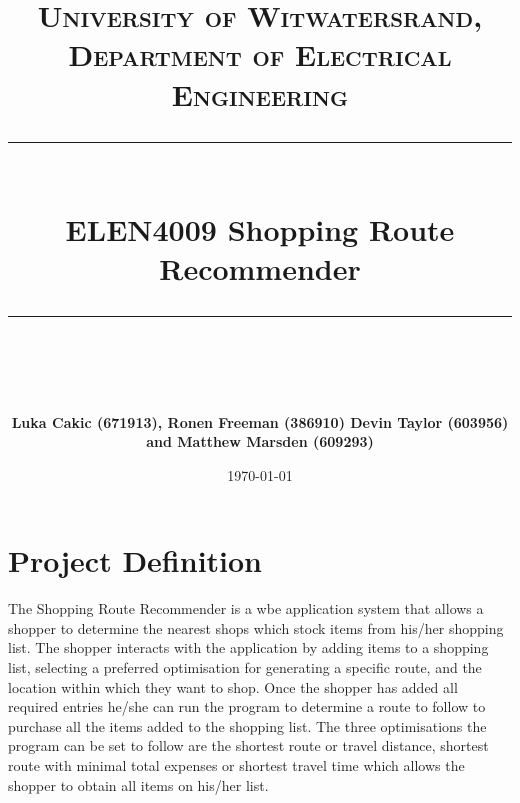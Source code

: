 \documentclass[10pt, a4paper, onecolumn]{scrartcl}
\newcommand{\horrule}[1]{\rule{\linewidth}{#1}}
\begin{document}
		\title{\normalfont \normalsize
			\textsc{University of Witwatersrand, Department of Electrical Engineering} \\ [10pt]
			\horrule{0.5pt} \\ [10pt]
			\huge ELEN4009 Shopping Route Recommender \\
			\horrule{2pt} \\ [10pt]}
		\author{\textbf{\normalsize{Luka Cakic (671913), Ronen Freeman (386910) Devin Taylor (603956) and Matthew Marsden (609293)}} \\ [10pt]}
		\date {\normalsize \today}
		
		\maketitle
		
%		
%		
%
%			
%	
		
	\section{Project Definition}
		
		The Shopping Route Recommender is a wbe application system that allows a shopper to determine the nearest shops which stock items from his/her shopping list. The shopper interacts with the application by adding items to a shopping list, selecting a preferred optimisation for generating a specific route, and the location within which they want to shop. Once the shopper has added all required entries he/she can run the program to determine a route to follow to purchase all the items added to the shopping list. The three optimisations the program can be set to follow are the shortest route or travel distance, shortest route with minimal total expenses or shortest travel time which allows the shopper to obtain all items on his/her list. 
				
\end{document}
